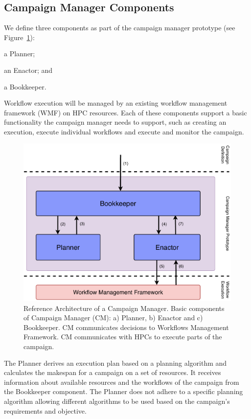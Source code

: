 \subsection{Campaign Manager Components}
\label{ssec:cm_arch}

We define three components as part of the campaign manager prototype (see Figure~\ref{fig:refarch}):
\begin{inparaenum}[(1)]
    \item a Planner;
    \item an Enactor; and
    \item a Bookkeeper. 
\end{inparaenum}
Workflow execution will be managed by an existing workflow management framework (WMF) on HPC resources.
Each of these components support a basic functionality the campaign manager needs to support, such as creating an execution, execute individual workflows and execute and monitor the campaign.

\begin{figure}[t]
    \centering
    \includegraphics[width=.75\textwidth]{figures/manager/CEM_design.pdf}
    \caption{Reference Architecture of a Campaign Manager. Basic 
        components of Campaign Manager (CM): a) Planner, b) Enactor and c) Bookkeeper. 
        CM communicates decisions to Workflows Management Framework. CM communicates with HPCs to 
        execute parts of the campaign.}\label{fig:refarch}
\end{figure}

The Planner derives an execution plan based on a planning algorithm and calculates the makespan for a campaign on a set of resources.
It receives information about available resources and the workflows of the campaign from the Bookkeeper component.
The Planner does not adhere to a specific planning algorithm allowing different algorithms to be used based on the campaign's requirements and objective.

